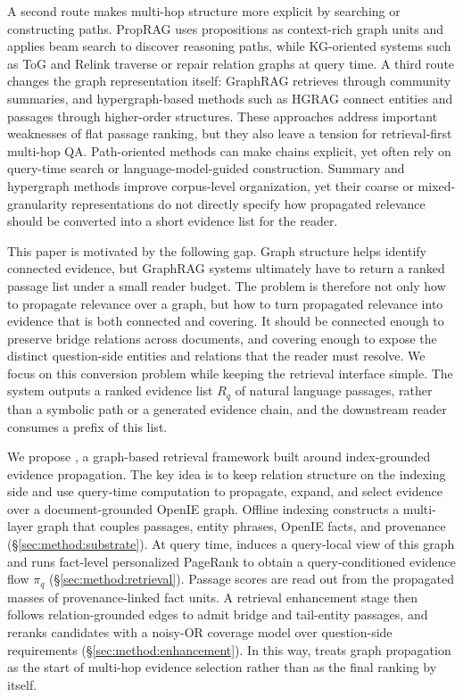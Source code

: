 A second route makes multi-hop structure more explicit by searching or
constructing paths. PropRAG \citep{wang2025proprag} uses propositions as
context-rich graph units and applies beam search to discover reasoning
paths, while KG-oriented systems such as ToG \citep{sun2024tog} and
Relink \citep{huang2026relink} traverse or repair relation graphs at
query time. A third route changes the graph representation itself:
GraphRAG \citep{edge2024graphrag} retrieves through community summaries,
and hypergraph-based methods such as HGRAG \citep{hgrag2024} connect
entities and passages through higher-order structures. These approaches
address important weaknesses of flat passage ranking, but they also
leave a tension for retrieval-first multi-hop QA. Path-oriented methods
can make chains explicit, yet often rely on query-time search or
language-model-guided construction. Summary and hypergraph methods
improve corpus-level organization, yet their coarse or mixed-granularity
representations do not directly specify how propagated relevance should
be converted into a short evidence list for the reader.

This paper is motivated by the following gap. Graph structure helps
identify connected evidence, but GraphRAG systems ultimately have to
return a ranked passage list under a small reader budget. The problem is
therefore not only how to propagate relevance over a graph, but how to
turn propagated relevance into evidence that is both connected and
covering. It should be connected enough to preserve bridge relations
across documents, and covering enough to expose the distinct
question-side entities and relations that the reader must resolve. We
focus on this conversion problem while keeping the retrieval interface
simple. The system outputs a ranked evidence list $R_q$ of natural
language passages, rather than a symbolic path or a generated evidence
chain, and the downstream reader consumes a prefix of this list.

We propose \methodname{}, a graph-based retrieval framework built around
index-grounded evidence propagation. The key idea is to keep relation
structure on the indexing side and use query-time computation to
propagate, expand, and select evidence over a document-grounded OpenIE
graph. Offline indexing constructs a multi-layer graph that couples
passages, entity phrases, OpenIE facts, and provenance
(\S\ref{sec:method:substrate}). At query time, \methodname{} induces a
query-local view of this graph and runs fact-level personalized PageRank
to obtain a query-conditioned evidence flow $\pi_q$
(\S\ref{sec:method:retrieval}). Passage scores are read out from the
propagated masses of provenance-linked fact units. A retrieval
enhancement stage then follows relation-grounded edges to admit bridge
and tail-entity passages, and reranks candidates with a noisy-OR coverage
model over question-side requirements
(\S\ref{sec:method:enhancement}). In this way, \methodname{} treats graph
propagation as the start of multi-hop evidence selection rather than as
the final ranking by itself.

